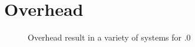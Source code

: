 \chapter{Overhead}\label{cha:Overhead}

\begin{figure}
\centering
\caption{Overhead result in a variety of systems for .0}
\end{figure}

